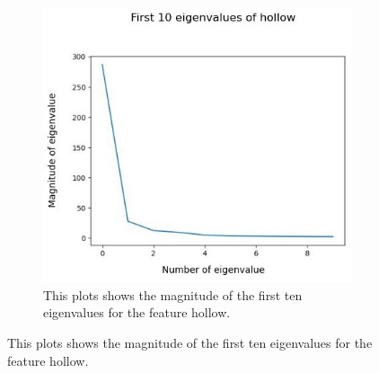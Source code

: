 
\begin{figure}[H]
	\centering
	\begin{subfigure}{0.7\textwidth}
		\includegraphics[width=0.9\linewidth]{Figures/chapter04/pca_hollow_graph.png} 
		\caption{This plots shows the magnitude of the first ten eigenvalues for the feature hollow.}
	\end{subfigure}
	\vspace{20pt}
	

\end{figure}
